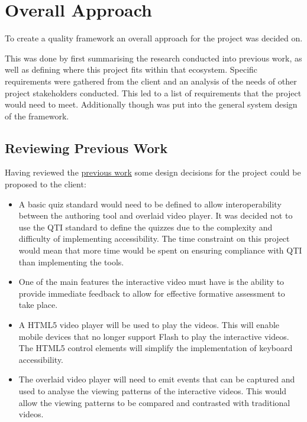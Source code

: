 \chapter{Overall Approach} 
\label{Chapter:Overall Approach}

\begin{preamble}
To create a quality framework an overall approach for the project was decided on.

This was done by first summarising the research conducted into previous work, as well as defining where this project fits within that ecosystem. Specific requirements were gathered from the client and an analysis of the needs of other project stakeholders conducted. This led to a list of requirements that the project would need to meet. Additionally though was put into the general system design of the framework.
\end{preamble}

\section{Reviewing Previous Work}
Having reviewed the \href{Chapter:Previous Work}{previous work} some design decisions for the project could be proposed to the client:
\begin{itemize}
\item A basic quiz standard would need to be defined to allow interoperability between the authoring tool and overlaid video player. It was decided not to use the \gls{QTI} standard to define the quizzes due to the complexity and difficulty of implementing accessibility. The time constraint on this project would mean that more time would be spent on ensuring compliance with \gls{QTI} than implementing the tools.
\item One of the main features the interactive video must have is the ability to provide immediate feedback to allow for effective formative assessment to take place.  \item A HTML5 video player will be used to play the videos. This will enable mobile devices that no longer support Flash to play the interactive videos. The HTML5 control elements will simplify the implementation of keyboard accessibility.
\item The overlaid video player will need to emit events that can be captured and used to analyse the viewing patterns of the interactive videos. This would allow the viewing patterns to be compared and contrasted with traditional videos.
\end{itemize}
